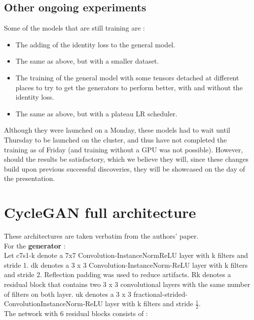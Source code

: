 \documentclass[twocolumn,superscriptaddress,aps,floatfix,nofootinbib]{revtex4-1}
\begin{document}
    \subsection{Other ongoing experiments}
    
    Some of the models that are still training are :
    \begin{itemize}
        \item The adding of the identity loss to the general model.
        \item The same as above, but with a smaller dataset.
        \item The training of the general model with some tensors detached at different places to try to get the generators to perform better, with and without the identity loss.
        \item The same as above, but with a plateau LR scheduler.
    \end{itemize}
    
    Although they were launched on a Monday, these models had to wait until Thursday to be launched on the cluster, and thus have not completed the training as of Friday (and training without a GPU was not possible). However, should the results be satisfactory, which we believe they will, since these changes build upon previous successful discoveries, they will be showcased on the day of the presentation.
    
    \section{CycleGAN full architecture}
    
    These architectures are taken verbatim from the authors' paper.\\
    
    For the \textbf{generator} : \\
    
    Let c7s1-k denote a 7x7 Convolution-InstanceNormReLU layer with k filters and stride 1. dk denotes a 3 x 3 Convolution-InstanceNorm-ReLU layer with k filters and stride 2. Reflection padding was used to reduce artifacts. Rk denotes a residual block that contains two 3 x 3 convolutional layers with the same number of filters on both layer. uk denotes a 3 x 3 fractional-strided-ConvolutionInstanceNorm-ReLU layer with k filters and stride $\frac{1}{2}$.\\
    
    The network with 6 residual blocks consists of :\\
    
\end{document}
